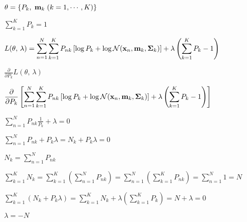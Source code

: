 \documentclass{article}
\def\lthtmlcheckvsize{\ifdim\ht\sizebox<\vsize 
  \ifdim\wd\sizebox<\hsize\expandafter\hfill\fi \expandafter\vfill
  \else\expandafter\vss\fi}%
\begin{document}
{\newpage\clearpage
{}%
$ {\bf\theta}=\{P_k,\;{\bf m}_k\;(k=1,\cdots,K)\}$%
\lthtmlindisplaymathZ
\lthtmlcheckvsize\clearpage}

{\newpage\clearpage
{}%
$ \sum_{k=1}^K P_k=1$%
\lthtmlindisplaymathZ
\lthtmlcheckvsize\clearpage}

{\newpage\clearpage
{}%
$\displaystyle L(\theta,\,\lambda)
=\sum_{n=1}^N \sum_{k=1}^K P_{nk}
\left[\log P_k+\log {\cal N}({\bf x}_n,{\bf m}_k,{\bf\Sigma}_k)\right]
+\lambda\left(\sum_{k=1}^K P_k-1\right)$%
\lthtmlindisplaymathZ
\lthtmlcheckvsize\clearpage}

{\newpage\clearpage
{}%
$\displaystyle \frac{\partial}{\partial P_k} L(\theta,\,\lambda)$%
\lthtmlindisplaymathZ
\lthtmlcheckvsize\clearpage}

{\newpage\clearpage
{}%
$\displaystyle \frac{\partial}{\partial P_k} \left[
\sum_{n=1}^N \sum_{k=1}^K P_{nk}
\left[\log P_k+\log {\cal N}({\bf x}_n,{\bf m}_k,{\bf\Sigma}_k)\right]
+\lambda\left(\sum_{k=1}^K P_k-1\right) \right]$%
\lthtmlindisplaymathZ
\lthtmlcheckvsize\clearpage}

{\newpage\clearpage
{}%
$\displaystyle \sum_{n=1}^N P_{nk}\frac{1}{P_k}+\lambda=0$%
\lthtmlindisplaymathZ
\lthtmlcheckvsize\clearpage}

{\newpage\clearpage
{}%
$\displaystyle \sum_{n=1}^N P_{nk}+P_k \lambda=N_k+P_k\lambda=0$%
\lthtmlindisplaymathZ
\lthtmlcheckvsize\clearpage}

{\newpage\clearpage
{}%
$\displaystyle N_k=\sum_{n=1}^N P_{nk}$%
\lthtmlindisplaymathZ
\lthtmlcheckvsize\clearpage}

{\newpage\clearpage
{}%
$\displaystyle \sum_{k=1}^K N_k=\sum_{k=1}^K\left(\sum_{n=1}^N P_{nk}\right)
=\sum_{n=1}^N\left(\sum_{k=1}^K P_{nk}\right)=\sum_{n=1}^N 1=N$%
\lthtmlindisplaymathZ
\lthtmlcheckvsize\clearpage}

{\newpage\clearpage
{}%
$\displaystyle \sum_{k=1}^K\left(N_k+P_k \lambda\right)
=\sum_{k=1}^K N_k+\lambda\left(\sum_{k=1}^K P_k\right)
=N+\lambda=0$%
\lthtmlindisplaymathZ
\lthtmlcheckvsize\clearpage}

{\newpage\clearpage
{}%
$ \lambda=-N$%
\lthtmlindisplaymathZ
\lthtmlcheckvsize\clearpage}
\end{document}
